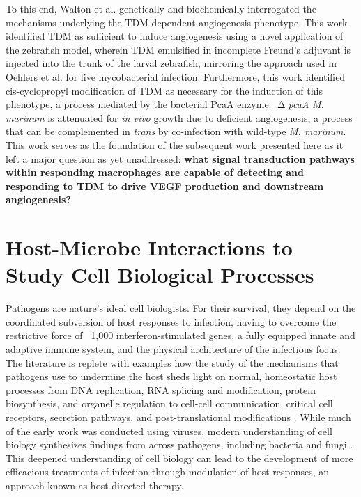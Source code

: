 To this end, Walton et al. genetically and biochemically interrogated the mechanisms underlying the TDM\hyp{}dependent angiogenesis phenotype. This work identified TDM as sufficient to induce angiogenesis using a novel application of the zebrafish model, wherein TDM emulsified in incomplete Freund's adjuvant is injected into the trunk of the larval zebrafish, mirroring the approach used in Oehlers et al. for live mycobacterial infection. Furthermore, this work identified cis\hyp{}cyclopropyl modification of TDM as necessary for the induction of this phenotype, a process mediated by the bacterial PcaA enzyme. $\upDelta$\textit{pcaA} \textit{M. marinum} is attenuated for \textit{in vivo} growth due to deficient angiogenesis, a process that can be complemented in \textit{trans} by co\hyp{}infection with wild\hyp{}type \textit{M. marinum}. This work serves as the foundation of the subsequent work presented here as it left a major question as yet unaddressed: \textbf{what signal transduction pathways within responding macrophages are capable of detecting and responding to TDM to drive VEGF production and downstream angiogenesis?}

\section{Host\hyp{}Microbe Interactions to Study Cell Biological Processes}\label{hmi}

Pathogens are nature's ideal cell biologists. For their survival, they depend on the coordinated subversion of host responses to infection, having to overcome the restrictive force of ~1,000 interferon\hyp{}stimulated genes, a fully equipped innate and adaptive immune system, and the physical architecture of the infectious focus. The literature is replete with examples how the study of the mechanisms that pathogens use to undermine the host sheds light on normal, homeostatic host processes from DNA replication, RNA splicing and modification, protein biosynthesis, and organelle regulation to cell\hyp{}cell communication, critical cell receptors, secretion pathways, and post\hyp{}translational modifications \citep{Compans1994}. While much of the early work was conducted using viruses, modern understanding of cell biology synthesizes findings from across pathogens, including bacteria and fungi \citep{Welch2015}. This deepened understanding of cell biology can lead to the development of more efficacious treatments of infection through modulation of host responses, an approach known as host\hyp{}directed therapy.

